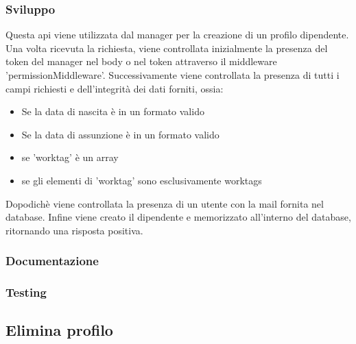 \documentclass{report}
\begin{document}
		\subsubsection*{Sviluppo}
		Questa api viene utilizzata dal manager per la creazione di un profilo dipendente.
		Una volta ricevuta la richiesta, viene controllata inizialmente la presenza del token del manager nel body o nel token attraverso il middleware 'permissionMiddleware'.
		Successivamente viene controllata la presenza di tutti i campi richiesti e dell'integrità dei dati forniti, ossia:
		\begin{itemize}
			\item Se la data di nascita è in un formato valido
			\item Se la data di assunzione è in un formato valido
			\item se 'worktag' è un array
			\item se gli elementi di 'worktag' sono esclusivamente worktags
		\end{itemize}
		Dopodichè viene controllata la presenza di un utente con la mail fornita nel database. 
		Infine viene creato il dipendente e memorizzato all'interno del database, ritornando una risposta positiva.
		\subsubsection*{Documentazione}

		\subsubsection*{Testing}

	\subsection*{Elimina profilo}
\end{document}
